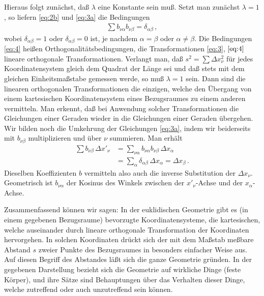 Hieraus folgt zunächst, daß $\lambda$ eine Konstante sein muß. Setzt man 
zunächst $\lambda = 1$, so liefern \eqref{eq:2b} und \eqref{eq:3a} die
Bedingungen
\begin{align}
	\sum b_{\nu \alpha} b_{\nu\beta} = \delta_{\alpha\beta}\,,
	\label{eq:4}
\end{align}
wobei $\delta_{\alpha\beta} = 1$ oder $\delta_{\alpha\beta} = 0$ ist, je 
nachdem $\alpha = \beta$ oder $\alpha \neq \beta$. Die Bedingungen 
\eqref{eq:4} heißen Orthogonalitätsbedingungen, die Transformationen 
\eqref{eq:3}, $\eqref{eq:4}$ lineare orthogonale Transformationen. Verlangt 
man, daß $s^2 = \sum \Delta x_{\nu}^2$ für jedes Koordinatensystem gleich dem 
Quadrat der Länge sei und daß stets mit dem gleichen Einheitsmaßstabe gemessen 
werde, so muß $\lambda = 1$ sein. Dann sind die linearen orthogonalen 
Transformationen die einzigen, welche den Übergang von einem kartesischen 
Koordinatensystem eines Bezugsraumes zu einem anderen vermitteln. Man erkennt, 
daß bei Anwendung solcher Transformationen die Gleichungen einer Geraden 
wieder in die Gleichungen einer Geraden übergehen. Wir bilden noch die 
Umkehrung der Gleichungen \eqref{eq:3a}, indem wir beiderseits mit 
$b_{\nu\beta}$ multiplizieren und über $\nu$ summieren. Man erhält
\begin{align}
	\sum b_{\nu\beta}\, \Delta x'_{\nu} &= \sum_{\nu\alpha}
		b_{\nu\alpha} b_{\nu\beta} \,\Delta x_{\alpha}
		\nonumber \\ %
		&= \sum_{\alpha}
		\delta_{\alpha\beta}\,\Delta x_{\alpha} = \Delta x_{\beta}\,.
	\label{eq:5}
\end{align}
Dieselben Koeffizienten $b$ vermitteln also auch die inverse Substitution der 
$\Delta x_{\nu}$. Geometrisch ist $b_{\nu\alpha}$ der Kosinus des Winkels 
zwischen der $x'_{\nu}$-Achse und der $x_{\alpha}$-Achse.

Zusammenfassend können wir sagen: In der euklidischen Geometrie gibt es (in 
einem gegebenen Bezugsraume) bevorzugte Koordinatensysteme, die kartesischen, 
welche auseinander durch lineare orthogonale Transformation der Koordinaten 
hervorgehen. In solchen Koordinaten drückt sich der mit dem Maßstab meßbare 
Abstand $s$ zweier Punkte des Bezugsraumes in besonders einfacher Weise aus. 
Auf diesen Begriff des Abstandes läßt sich die ganze Geometrie gründen. In der
gegebenen Darstellung bezieht sich die Geometrie auf wirkliche Dinge (feste 
Körper), und ihre Sätze sind Behauptungen über das Verhalten dieser Dinge, 
welche zutreffend oder auch unzutreffend sein können.

